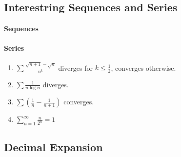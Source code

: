 \documentclass[../note.tex]{subfiles}
\begin{document}
\subsection{Interestring Sequences and Series}
\paragraph{Sequences}
\paragraph{Series}
	\small
\begin{enumerate}
	\item $\sum \frac{\sqrt{n+1}-\sqrt{n}}{n^k}$ diverges for $k\leq \frac{1}{2}$, converges otherwise.
	\item $\sum \frac{1}{n\log{n}}$ diverges.
	\item $\sum(\frac{1}{n}-\frac{1}{n+1})$ converges. 
	\item $\sum^{\infty}_{n=1}\frac{n}{2^n}=1$  
\end{enumerate}


\subsection{Decimal Expansion}
\end{document}
